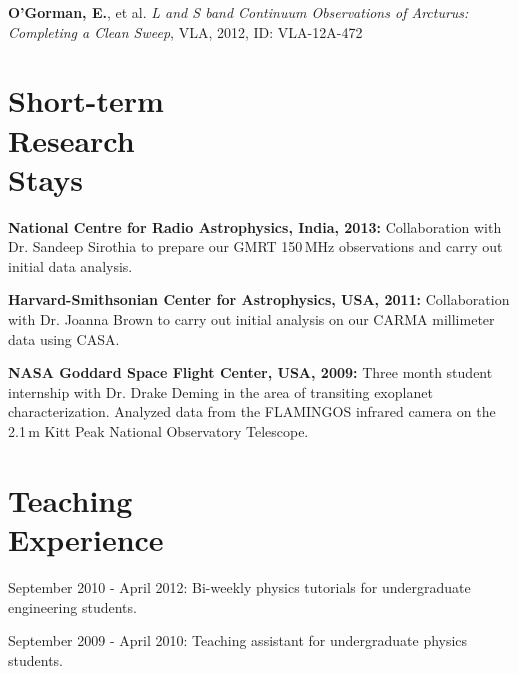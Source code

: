 \documentclass[margin,line]{resume}
\begin{document}
\begin{resume}
\textbf{O'Gorman, E.}, et al. \textit{L and S band Continuum Observations of Arcturus: Completing a Clean Sweep}, VLA, 2012, ID: VLA-12A-472%

    \vspace{2mm}
    \section{\mysidestyle Short-term\\Research\\Stays}

\textbf{National Centre for Radio Astrophysics, India, 2013:} Collaboration with Dr. Sandeep Sirothia to prepare our GMRT 150\,MHz observations and carry out initial data analysis.

\textbf{Harvard-Smithsonian Center for Astrophysics, USA, 2011:} Collaboration with Dr. Joanna Brown to carry out initial analysis on our CARMA millimeter data using CASA. 

\textbf{NASA Goddard Space Flight Center, USA, 2009:} Three month student internship with Dr. Drake Deming in the area of transiting exoplanet characterization. Analyzed data from the FLAMINGOS infrared camera on the 2.1\,m Kitt Peak National Observatory Telescope.

    \vspace{2mm}
    \section{\mysidestyle Teaching\\Experience}

	\begin{list2}
    \item September 2010 - April 2012: Bi-weekly physics tutorials for undergraduate engineering students.
    \item September 2009 - April 2010: Teaching assistant for undergraduate physics students. \vspace{-1mm}\\%
    \end{list2}

    \vspace{0mm}

\end{resume}
\end{document}

